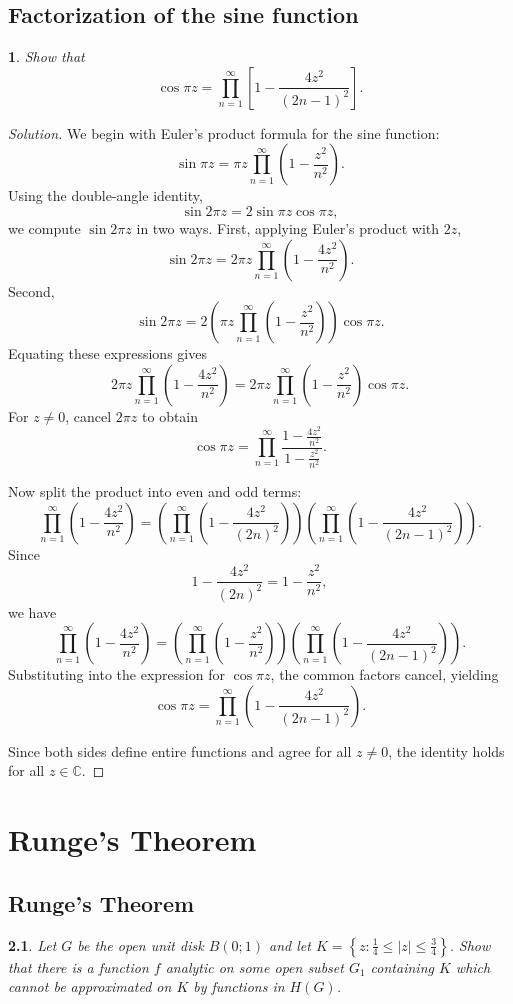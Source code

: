 \documentclass[12pt, a4paper]{report}
\theoremstyle{spaced}
\newtheorem{exercise}{}
\newcommand{\setexercise}[1]{\setcounter{exercise}{#1-1}}
\begin{document}
\section{Factorization of the sine function}
\setexercise{1}
\begin{exercise}
	Show that
	\[
		\cos \pi z=\prod_{n=1}^{\infty}\left[1-\frac{4z^2}{(2n-1)^2}\right].
	\]
\end{exercise}
\begin{proof}[Solution]
	We begin with Euler’s product formula for the sine function:
	\[
		\sin \pi z=\pi z\prod_{n=1}^{\infty}\left(1-\frac{z^2}{n^2}\right).
	\]
	Using the double-angle identity,
	\[
		\sin 2\pi z=2\sin \pi z \cos \pi z,
	\]
	we compute \(\sin 2\pi z\) in two ways. First, applying Euler’s product with \(2z\),
	\[
		\sin 2\pi z
		=2\pi z\prod_{n=1}^{\infty}\left(1-\frac{4z^2}{n^2}\right).
	\]
	Second,
	\[
		\sin 2\pi z
		=
		2\left(\pi z\prod_{n=1}^{\infty}\left(1-\frac{z^2}{n^2}\right)\right)\cos \pi z.
	\]
	Equating these expressions gives
	\[
		2\pi z\prod_{n=1}^{\infty}\left(1-\frac{4z^2}{n^2}\right)
		=
		2\pi z\prod_{n=1}^{\infty}\left(1-\frac{z^2}{n^2}\right)\cos \pi z.
	\]
	For \(z\neq 0\), cancel \(2\pi z\) to obtain
	\[
		\cos \pi z
		=
		\prod_{n=1}^{\infty}
		\frac{1-\frac{4z^2}{n^2}}{1-\frac{z^2}{n^2}}.
	\]

	Now split the product into even and odd terms:
	\[
		\prod_{n=1}^{\infty}\left(1-\frac{4z^2}{n^2}\right)
		=
		\left(\prod_{n=1}^{\infty}\left(1-\frac{4z^2}{(2n)^2}\right)\right)
		\left(\prod_{n=1}^{\infty}\left(1-\frac{4z^2}{(2n-1)^2}\right)\right).
	\]
	Since
	\[
		1-\frac{4z^2}{(2n)^2}=1-\frac{z^2}{n^2},
	\]
	we have
	\[
		\prod_{n=1}^{\infty}\left(1-\frac{4z^2}{n^2}\right)
		=
		\left(\prod_{n=1}^{\infty}\left(1-\frac{z^2}{n^2}\right)\right)
		\left(\prod_{n=1}^{\infty}\left(1-\frac{4z^2}{(2n-1)^2}\right)\right).
	\]
	Substituting into the expression for \(\cos \pi z\), the common factors cancel, yielding
	\[
		\cos \pi z
		=
		\prod_{n=1}^{\infty}\left(1-\frac{4z^2}{(2n-1)^2}\right).
	\]

	Since both sides define entire functions and agree for all \(z\neq 0\), the identity holds for all \(z\in\mathbb{C}\).
\end{proof}


\chapter{Runge's Theorem}
\section{Runge's Theorem}
\setexercise{2}
\begin{exercise}
	Let $G$ be the open unit disk $B(0;1)$ and let
	\(
	K=\left\{z:\frac{1}{4}\le |z|\le \frac{3}{4}\right\}.
	\)
	Show that there is a function $f$ analytic on some open subset $G_1$ containing $K$ which cannot be approximated on $K$ by functions in $H(G)$.
\end{exercise}
\end{document}
